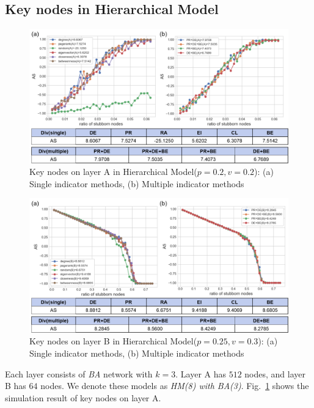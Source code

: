 \subsection{Key nodes in Hierarchical Model}
\begin{figure}[!htb]
	\centering
	\includegraphics[width=\hsize]{figure/chap5_keynode_HM_A.png}
	\caption{Key nodes on layer A in Hierarchical Model($p=0.2, v=0.2$):
		(a) Single indicator methods, (b) Multiple indicator methods}
	\label{chap5_keynode_HM_A}
\end{figure}
\begin{figure}[!htb]
	\centering
	\includegraphics[width=\hsize]{figure/chap5_keynode_HM_B.png}
	\caption{Key nodes on layer B in Hierarchical Model($p=0.25, v=0.3$):
		(a) Single indicator methods, (b) Multiple indicator methods}
	\label{chap5_keynode_HM_B}
\end{figure}
Each layer consists of \textit{BA} network with $k=3$. Layer A has $512$ nodes, and layer B has $64$ nodes. We denote these models as \textit{HM(8) with BA(3)}.
Fig.~\ref{chap5_keynode_HM_A} shows the simulation result of key nodes on layer A. 


